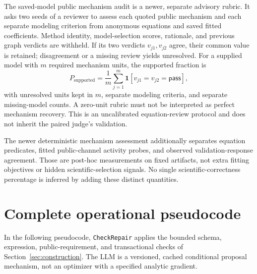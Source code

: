 \documentclass[11pt]{article}
\newcommand{\ind}{\mathbf{1}}
\begin{document}
The saved-model public mechanism audit is a newer, separate advisory rubric.
It asks two seeds of a reviewer to assess each quoted public mechanism and each
separate modeling criterion from anonymous equations and saved fitted
coefficients. Method identity, model-selection scores, rationale, and previous
graph verdicts are withheld. If its two verdicts $v_{j1},v_{j2}$ agree, their
common value is retained; disagreement or a missing review yields unresolved.
For a supplied model with $m$ required mechanism units, the supported fraction is
\begin{equation}
 P_{\mathrm{supported}}=\frac1m\sum_{j=1}^{m}\ind[v_{j1}=v_{j2}=\mathsf{pass}],
\end{equation}
with unresolved units kept in $m$, separate modeling criteria, and separate
missing-model counts. A zero-unit rubric must not be interpreted as perfect
mechanism recovery. This is an uncalibrated equation-review protocol and does not
inherit the paired judge's validation.

The newer deterministic mechanism assessment additionally separates equation
predicates, fitted public-channel activity probes, and observed validation-response
agreement. Those are post-hoc measurements on fixed artifacts, not extra fitting
objectives or hidden scientific-selection signals. No single scientific-correctness
percentage is inferred by adding these distinct quantities.

\clearpage
\section{Complete operational pseudocode}
\label{sec:pseudocode}

In the following pseudocode, \texttt{CheckRepair} applies the bounded schema,
expression, public-requirement, and transactional checks of
Section~\ref{sec:construction}. The LLM is a versioned, cached conditional
proposal mechanism, not an optimizer with a specified analytic gradient.
\end{document}
